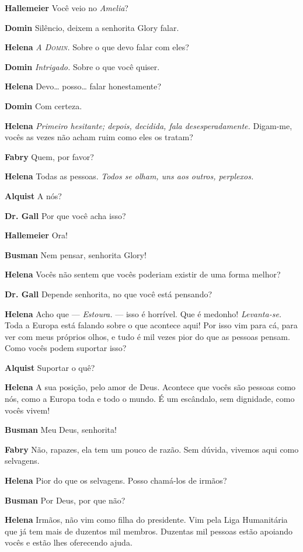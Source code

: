 \textbf{Hallemeier} Você veio no \textit{Amelia}?

\textbf{Domin} Silêncio, deixem a senhorita Glory falar.

\textbf{Helena} \emph{A \textsc{Domin}.} Sobre o que devo falar com eles?

\textbf{Domin} \emph{Intrigado.} Sobre o que você quiser.

\textbf{Helena} Devo\ldots{} posso\ldots{} falar honestamente?

\textbf{Domin} Com certeza.

\textbf{Helena} \emph{Primeiro hesitante; depois, decidida, fala
desesperadamente.} Digam-me, vocês as vezes não acham ruim como eles os tratam?

\textbf{Fabry} Quem, por favor?

\textbf{Helena} Todas as pessoas.
\emph{Todos se olham, uns aos outros, perplexos.}

\textbf{Alquist} A nós?

\textbf{Dr. Gall} Por que você acha isso?

\textbf{Hallemeier} Ora!

\textbf{Busman} Nem pensar, senhorita Glory!

\textbf{Helena} Vocês não sentem que vocês poderiam existir de uma forma melhor?

\textbf{Dr. Gall} Depende senhorita, no que você está pensando?

\textbf{Helena} Acho que --- \emph{Estoura.} --- isso é horrível. Que é medonho!
\emph{Levanta-se.} Toda a Europa está falando sobre o que acontece aqui! 
Por isso vim para cá, para ver com meus próprios olhos, e
tudo é mil vezes pior do que as pessoas pensam. Como vocês podem suportar isso?

\textbf{Alquist} Suportar o quê?

\textbf{Helena} A sua posição, pelo amor de Deus. Acontece que vocês são pessoas
como nós, como a Europa toda e todo o mundo. É um escândalo, sem dignidade, como
vocês vivem!

\textbf{Busman} Meu Deus, senhorita!

\textbf{Fabry} Não, rapazes, ela tem um pouco de razão. Sem dúvida, vivemos aqui como selvagens.

\textbf{Helena} Pior do que os selvagens. Posso chamá-los de irmãos?

\textbf{Busman} Por Deus, por que não?

\textbf{Helena} Irmãos, não vim como filha do presidente. Vim pela Liga Humanitária que
já tem mais de duzentos mil membros. Duzentas mil pessoas estão apoiando vocês e
estão lhes oferecendo ajuda. 

